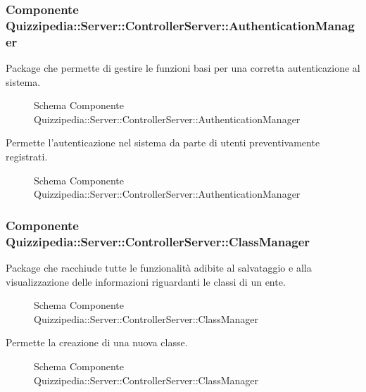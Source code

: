 \subsubsection{Componente Quizzipedia::Server::ControllerServer::AuthenticationManager}
Package che permette di gestire le funzioni basi per una corretta autenticazione al sistema.
\begin{figure}[H]
\centering
\noindent{}
\caption{Schema Componente Quizzipedia::Server::ControllerServer::AuthenticationManager}
\end{figure}
Permette l'autenticazione nel sistema da parte di utenti preventivamente registrati.
\begin{figure}[H]
\centering
\noindent{}
\caption{Schema Componente Quizzipedia::Server::ControllerServer::AuthenticationManager}
\end{figure}
\subsubsection{Componente Quizzipedia::Server::ControllerServer::ClassManager}
Package che racchiude tutte le funzionalità adibite al salvataggio e alla visualizzazione delle informazioni riguardanti le classi di un ente.
\begin{figure}[H]
\centering
\noindent{}
\caption{Schema Componente Quizzipedia::Server::ControllerServer::ClassManager}
\end{figure}
Permette la creazione di una nuova classe.
\begin{figure}[H]
\centering
\noindent{}
\caption{Schema Componente Quizzipedia::Server::ControllerServer::ClassManager}
\end{figure}
